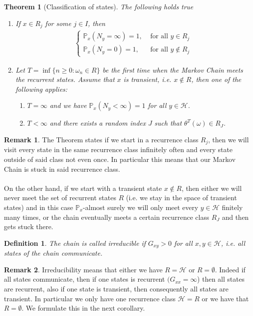 \documentclass[11pt,a4paper, final]{article}
\newtheorem{thm}{Theorem}[section]
\newtheorem{defn}{Definition}[section]
\theoremstyle{definition}
\newtheorem{rem}{Remark}[section]
\begin{document}
\begin{thm}[Classification of states] The following holds true
\begin{enumerate}
\item If $x \in R_j$ for some $j \in I$, then 
\begin{align*}
\begin{cases} \mathbb{P}_x ( N_y = \infty) = 1, & \text{ for all } y \in R_j \\ 
\mathbb{P}_x ( N_y = 0) = 1, & \text{ for all } y \notin R_j \end{cases}
\end{align*}
\item Let $T= \inf \lbrace n \geq 0 : \omega_n \in R \rbrace$ be the first time when the Markov Chain meets the recurrent states. Assume that $x$ is transient, i.e. $x \notin R$, then one of the following applies:
\begin{enumerate}
\item  $T= \infty$ and we have $\mathbb{P}_x(N_y < \infty) =1$ for all $y \in \mathcal{H}$. 
\item $T < \infty$ and there exists a random index $J$ such that $\theta^T(\omega) \in R_J$. 
\end{enumerate}
\end{enumerate}
\end{thm}
\begin{rem} The Theorem states if we start in a recurrence class $R_j$, then we will visit every state in the same recurrence class infinitely often and every state outside of said class not even once. In particular this means that our Markov Chain is stuck in said recurrence class. 
\\\\
On the other hand, if we start with a transient state $x \notin R$, then either we will never meet the set of recurrent states $R$ (i.e. we stay in the space of transient states) and in this case $\mathbb{P}_x$-almost surely we will only meet every $y \in \mathcal{H}$ finitely many times, or the chain eventually meets a certain recurrence class $R_J$ and then gets stuck there. 
\end{rem}
\begin{defn} The chain is called irreducible if $G_{xy} > 0$ for all $x,y \in \mathcal{H}$, i.e. all states of the chain communicate.  
\end{defn}
\begin{rem}Irreducibility means that either we have $R= \mathcal{H}$ or $R= \emptyset$. Indeed if all states communicate, then if one states is recurrent $(G_{xx}= \infty$) then all states are recurrent, also if one state is transient, then consequently all states are transient. In particular we only have one recurrence class $\mathcal{H}=R$ or we have that $R= \emptyset$. We formulate this in the next corollary. 
\end{rem}
\end{document}
